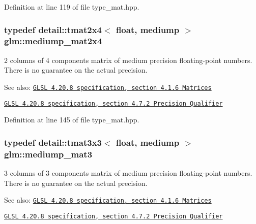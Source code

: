 Definition at line 119 of file type\_\-mat.hpp.\hypertarget{group__core__precision_ge90cf4be1ded03a3a5b7b42045da253c}{
\subsubsection[mediump\_\-mat2x4]{\setlength{\rightskip}{0pt plus 5cm}typedef detail::tmat2x4$<$ float, mediump $>$ {\bf glm::mediump\_\-mat2x4}}}
\label{group__core__precision_ge90cf4be1ded03a3a5b7b42045da253c}


2 columns of 4 components matrix of medium precision floating-point numbers. There is no guarantee on the actual precision.

\begin{Desc}
\item[See also:]\href{http://www.opengl.org/registry/doc/GLSLangSpec.4.20.8.pdf}{\tt GLSL 4.20.8 specification, section 4.1.6 Matrices} 

\href{http://www.opengl.org/registry/doc/GLSLangSpec.4.20.8.pdf}{\tt GLSL 4.20.8 specification, section 4.7.2 Precision Qualifier} \end{Desc}


Definition at line 145 of file type\_\-mat.hpp.\hypertarget{group__core__precision_gcf45e22f1fb2703b181995676963a1f9}{
\subsubsection[mediump\_\-mat3]{\setlength{\rightskip}{0pt plus 5cm}typedef detail::tmat3x3$<$ float, mediump $>$ {\bf glm::mediump\_\-mat3}}}
\label{group__core__precision_gcf45e22f1fb2703b181995676963a1f9}


3 columns of 3 components matrix of medium precision floating-point numbers. There is no guarantee on the actual precision.

\begin{Desc}
\item[See also:]\href{http://www.opengl.org/registry/doc/GLSLangSpec.4.20.8.pdf}{\tt GLSL 4.20.8 specification, section 4.1.6 Matrices} 

\href{http://www.opengl.org/registry/doc/GLSLangSpec.4.20.8.pdf}{\tt GLSL 4.20.8 specification, section 4.7.2 Precision Qualifier} \end{Desc}


